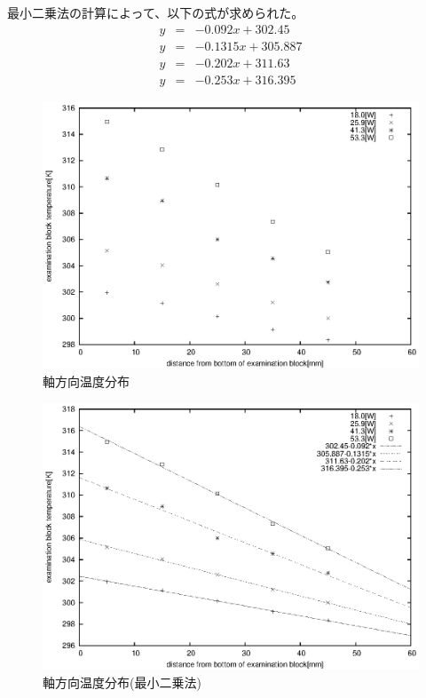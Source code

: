 \documentclass[a4j,twoside,openright,11pt]{jarticle}
\begin{document}
最小二乗法の計算によって、以下の式が求められた。
\begin{eqnarray}
y&=&-0.092x+302.45\\
y&=&-0.1315x+305.887\\
y&=&-0.202x+311.63\\
y&=&-0.253x+316.395
\end{eqnarray}

\begin{figure}[htbp]
\begin{center}
  \includegraphics[width=12cm]{./fulie/data.eps}
\end{center}
\caption{軸方向温度分布}
\end{figure}

\begin{figure}[htbp]
\begin{center}
  \includegraphics[width=12cm]{./fulie/data2.eps}
\end{center}
\caption{軸方向温度分布(最小二乗法)}
\end{figure}
\end{document}
